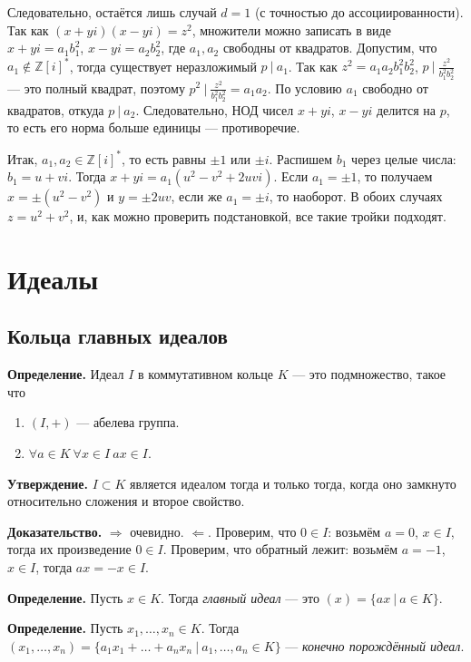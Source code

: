 Следовательно, остаётся лишь случай $d = 1$ (с точностью до ассоциированности).
Так как $(x + yi)(x - yi) = z^2$, множители можно записать в виде $x + yi = a_1 b_1^2$, $x - yi = a_2 b_2^2$, где $a_1, a_2$ свободны от квадратов.
Допустим, что $a_1 \not\in \mathbb Z[i]^*$, тогда существует неразложимый $p~|~a_1$.
Так как $z^2 = a_1 a_2 b_1^2 b_2^2$, $p~|~\frac{z^2}{b_1^2 b_2^2}$ --- это полный квадрат, поэтому $p^2~|~\frac{z^2}{b_1^2 b_2^2} = a_1 a_2$.
По условию $a_1$ свободно от квадратов, откуда $p~|~a_2$.
Следовательно, НОД чисел $x + yi$, $x - yi$ делится на $p$, то есть его норма больше единицы --- противоречие.

Итак, $a_1, a_2 \in \mathbb Z[i]^*$, то есть равны $\pm 1$ или $\pm i$.
Распишем $b_1$ через целые числа: $b_1 = u + vi$.
Тогда $x + yi = a_1 (u^2 - v^2 + 2uvi)$.
Если $a_1 = \pm 1$, то получаем $x = \pm (u^2 - v^2)$ и $y = \pm 2uv$, если же $a_1 = \pm i$, то наоборот.
В обоих случаях $z = u^2 + v^2$, и, как можно проверить подстановкой, все такие тройки подходят.

\section{Идеалы}
\subsection{Кольца главных идеалов}
\textbf{Определение.} Идеал $I$ в коммутативном кольце $K$ --- это подмножество, такое что
\begin{enumerate}
    \item $(I, +)$ --- абелева группа.
    \item $\forall a \in K~\forall x \in I~ax \in I$.
\end{enumerate}

\textbf{Утверждение.} $I \subset K$ является идеалом тогда и только тогда, когда оно замкнуто относительно сложения и второе свойство.

\textbf{Доказательство.} $\Rightarrow$ очевидно. $\Leftarrow$. Проверим, что $0 \in I$: возьмём $a = 0$, $x \in I$, тогда их произведение $0 \in I$.
Проверим, что обратный лежит: возьмём $a = -1$, $x \in I$, тогда $ax = -x \in I$.

\QED

\textbf{Определение.} Пусть $x \in K$. Тогда \textit{главный идеал} --- это $(x) = \{ax~|~a \in K\}$.

\textbf{Определение.} Пусть $x_1, \dots, x_n \in K$.
Тогда $(x_1, \dots, x_n) = \{a_1x_1 + \dots + a_n x_n~|~a_1, \dots, a_n \in K\}$ --- \textit{конечно порождённый идеал}.

